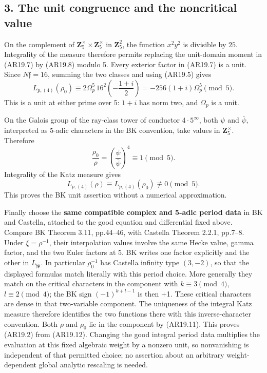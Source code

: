 \documentclass[11pt,a4paper]{article}
\begin{document}
\subsection{3. The unit congruence and the noncritical
value}\label{the-unit-congruence-and-the-noncritical-value}

On the complement of \(\mathbf Z_5^\times\times\mathbf Z_5^\times\) in
\(\mathbf Z_5^2\), the function \(x^2y^2\) is divisible by \(25\).
Integrality of the measure therefore permits replacing the unit-domain
moment in (AR19.7) by (AR19.8) modulo 5. Every exterior factor in
(AR19.7) is a unit. Since \(N\mathfrak f=16\), summing the two classes
and using (AR19.5) gives \[
L_{p,(4)}(\rho_0)
 \equiv2\Omega_p^5\,16^2
          \left(-\frac{1+i}{2}\right)
 =-256(1+i)\Omega_p^5\pmod5.
\tag{AR19.10}
\] This is a unit at either prime over 5: \(1+i\) has norm two, and
\(\Omega_p\) is a unit.

On the Galois group of the ray-class tower of conductor
\(4\cdot5^\infty\), both \(\psi\) and \(\bar\psi\), interpreted as
5-adic characters in the BK convention, take values in
\(\mathbf Z_5^\times\). Therefore \[
\frac{\rho_0}{\rho}
 =\left(\frac{\psi}{\bar\psi}\right)^4
 \equiv1\pmod5.
\tag{AR19.11}
\] Integrality of the Katz measure gives \[
L_{p,(4)}(\rho)\equiv L_{p,(4)}(\rho_0)\not\equiv0\pmod5.
\tag{AR19.12}
\] This proves the BK unit assertion without a numerical approximation.

Finally choose the \textbf{same compatible complex and 5-adic period
data} in BK and Castella, attached to the good equation and differential
fixed above. Compare BK Theorem 3.11, pp.44--46, with Castella Theorem
2.2.1, pp.7--8. Under \(\xi=\rho^{-1}\), their interpolation values
involve the same Hecke value, gamma factor, and the two Euler factors at
5. BK writes one factor explicitly and the other in
\(L_{\mathfrak f\bar{\mathfrak p}}\). In particular \(\rho_0^{-1}\) has
Castella infinity type \((3,-2)\), so that the displayed formulas match
literally with this period choice. More generally they match on the
critical characters in the component with \(k\equiv3\pmod4\),
\(l\equiv2\pmod4\); the BK sign \((-1)^{k+l-1}\) is then +1. These
critical characters are dense in that two-variable component. The
uniqueness of the integral Katz measure therefore identifies the two
functions there with this inverse-character convention. Both \(\rho\)
and \(\rho_0\) lie in the component by (AR19.11). This proves (AR19.2)
from (AR19.12). Changing the good integral period data multiplies the
evaluation at this fixed algebraic weight by a nonzero unit, so
nonvanishing is independent of that permitted choice; no assertion about
an arbitrary weight-dependent global analytic rescaling is needed.
\end{document}
